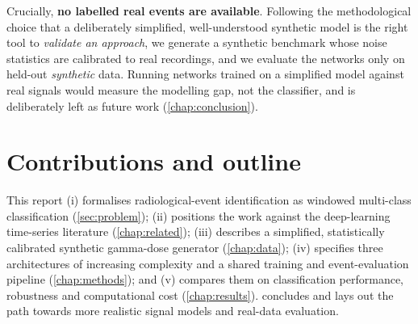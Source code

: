 Crucially, \textbf{no labelled real events are available}. Following the
methodological choice that a deliberately simplified, well-understood synthetic
model is the right tool to \emph{validate an approach}, we generate a synthetic
benchmark whose noise statistics are calibrated to real recordings, and we
evaluate the networks only on held-out \emph{synthetic} data. Running networks
trained on a simplified model against real signals would measure the modelling
gap, not the classifier, and is deliberately left as future work
(\cref{chap:conclusion}).

\section{Contributions and outline}
\label{sec:contrib}

This report (i) formalises radiological-event identification as windowed
multi-class classification (\cref{sec:problem}); (ii) positions the work against
the deep-learning time-series literature (\cref{chap:related}); (iii) describes a
simplified, statistically calibrated synthetic gamma-dose generator
(\cref{chap:data}); (iv) specifies three architectures of increasing complexity
and a shared training and event-evaluation pipeline (\cref{chap:methods}); and
(v) compares them on classification performance, robustness and computational
cost (\cref{chap:results}).  concludes and lays out the
path towards more realistic signal models and real-data evaluation.
